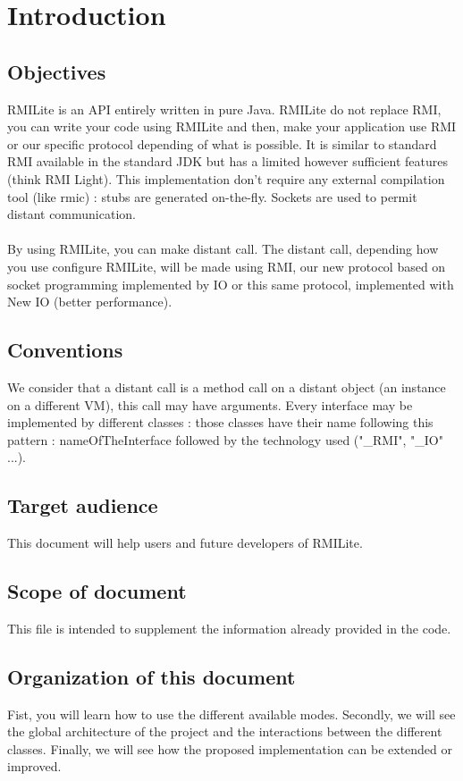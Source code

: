 \chapter{Introduction}

\section{Objectives}

RMILite is an API entirely written in pure Java. RMILite do not replace RMI, you can write your code using RMILite and then, make your application use RMI or our specific protocol depending of what is possible. It is similar to standard RMI available in the standard JDK but has a limited however sufficient features (think RMI Light). This implementation don't require any external compilation tool (like rmic) : stubs are generated on-the-fly. Sockets are used to permit distant communication.\\
\\
By using RMILite, you can make distant call. The distant call, depending how you use configure RMILite, will be made using RMI, our new protocol based on socket programming implemented by IO or this same protocol, implemented with New IO (better performance).

\section{Conventions}
We consider that a distant call is a method call on a distant object (an instance on a different VM), this call may have arguments.
\medskip
Every interface may be implemented by different classes : those classes have their name following this pattern : nameOfTheInterface followed by the technology used ("\_RMI", "\_IO" ...).

\section{Target audience}
This document will help users and future developers of RMILite.

\section{Scope of document}
This file is intended to supplement the information already provided in the code.

\section{Organization of this document}
Fist, you will learn how to use the different available modes. Secondly, we will see the global architecture of the project and the interactions between the different classes. Finally, we will see how the proposed implementation can be extended or improved.

